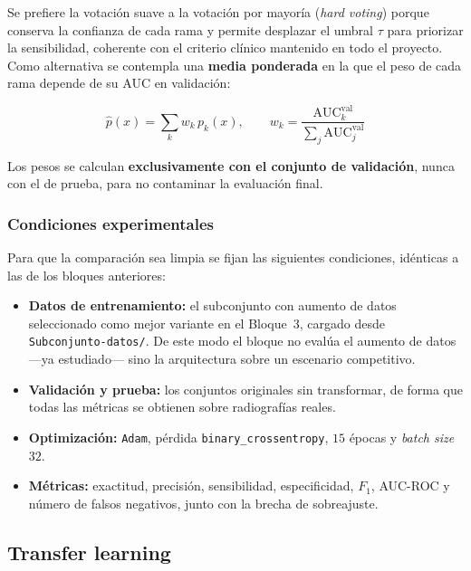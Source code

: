 \documentclass[11pt, a4paper]{article}
\numberwithin{equation}{section}
\begin{document}
Se prefiere la votación suave a la votación por mayoría (\textit{hard voting}) porque
conserva la confianza de cada rama y permite desplazar el umbral $\tau$ para priorizar
la sensibilidad, coherente con el criterio clínico mantenido en todo el proyecto. Como
alternativa se contempla una \textbf{media ponderada} en la que el peso de cada rama
depende de su AUC en validación:

\begin{equation}
\hat{p}(x) = \sum_{k} w_k \, p_k(x),
\qquad
w_k = \frac{\mathrm{AUC}_k^{\text{val}}}{\sum_j \mathrm{AUC}_j^{\text{val}}}
\end{equation}

Los pesos se calculan \textbf{exclusivamente con el conjunto de validación}, nunca con
el de prueba, para no contaminar la evaluación final.

\subsubsection{Condiciones experimentales}

Para que la comparación sea limpia se fijan las siguientes condiciones, idénticas a las
de los bloques anteriores:

\begin{itemize}
    \item \textbf{Datos de entrenamiento:} el subconjunto con aumento de datos seleccionado
    como mejor variante en el Bloque~3, cargado desde
    \texttt{Subconjunto-datos/}. De este modo el bloque no evalúa el aumento de datos
    ---ya estudiado--- sino la arquitectura sobre un escenario competitivo.
    \item \textbf{Validación y prueba:} los conjuntos originales sin transformar, de forma
    que todas las métricas se obtienen sobre radiografías reales.
    \item \textbf{Optimización:} \texttt{Adam}, pérdida \texttt{binary\_crossentropy},
    $15$ épocas y \textit{batch size} $32$.
    \item \textbf{Métricas:} exactitud, precisión, sensibilidad, especificidad, $F_1$,
    AUC-ROC y número de falsos negativos, junto con la brecha de sobreajuste.
\end{itemize}


\newpage
\subsection{Transfer learning}
\end{document}
